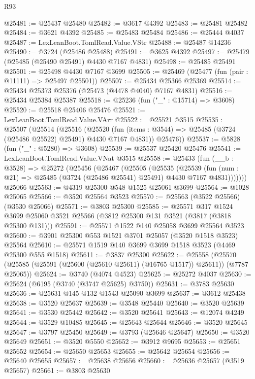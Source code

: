 \begin{lexlean}{R93}
\begin{coremodule}
@25481 := @25437 @25480
@25482 := @3617 @4392
@25483 := @25481 @25482
@25484 := @3621 @4392
@25485 := @25483 @25484
@25486 := @25444 @4037
@25487 := LexLeanBoot.TomlRead.Value.VStr
@25488 := @25487 @14236
@25490 := @3724 (@25486 @25488)
@25491 := @3625 @4392
@25497 := @25479 (@25485 (@25490 @25491) @4430 @7167 @4831)
@25498 := @25485 @25491
@25501 := @25498 @4430 @7167 @3699
@25505 := @25469 (@25477 (fun (pair : @11111) => @25497 @25501))
@25507 := @25434 @25366 @25369
@25514 := @25434 @25373 @25376 (@25473 (@4478 @4040) @7167 @4831)
@25516 := @25434 @25384 @25387
@25518 := @25236 (fun ("_" : @15714) => @3608)
@25520 := @25518 @25406 @25476
@25521 := LexLeanBoot.TomlRead.Value.VArr
@25522 := @25521 @3515
@25535 := @25507
    (@25514
      (@25516
        (@25520 (fun (items : @3544) => @25485 (@3724 (@25486 @25522) @25491) @4430 @7167 @4831))
        @25476))
@25537 := @5828 (fun ("_" : @5280) => @3608)
@25539 := @25537 @25420 @25476
@25541 := LexLeanBoot.TomlRead.Value.VNat @3515
@25558 := @25433
    (fun (__b : @3528) =>
    @25272
      (@25456
        (@25467
          (@25505
            (@25535
              (@25539
                (fun (num : @21) => @25485 (@3724 (@25486 @25541) @25491) @4430 @7167 @4831)))))))
    @25066
@25563 := @4319 @25300 @548 @1525 @25061 @3699
@25564 := @1028 @25065
@25566 := @3520 @25564 @3523
@25570 := @25563 (@3522 @25566) (@3530 @25066)
@25571 := @3803 @25300
@25585 := @25571
    @317
    @1524
    @3699
    @25060
    @3521
    @25566
    (@3812 @25300 @131 @3521 (@3817 (@3818 @25300 @131)))
@25591 := @25571 @1522 @140 @25058 @3699 @25564 @3523
@25600 := @3901 @25300 @553 @1521 @3701 @25057 (@3520 @1518 @3523) @25564
@25610 := @25571 @1519 @140 @3699 @3699 @1518 @3523 (@4469 @25300 @555 @1518)
@25611 := @3837 @25300
@25622 := @25558
    (@25570 (@25585 (@25591 (@25600 (@25610 @25611) (@16765 @1517)) @25611)) (@7787 @25065))
@25624 := @3740 (@4074 @4523)
@25625 := @25272 @4037
@25630 := @25624 (@6195 (@3740 (@3747 @25625) @3750))
@25631 := @3783 @25630
@25636 := @25631 @145 @132 @1543 @25090 @3699
@25637 := @3612 @25438
@25638 := @3520 @25637
@25639 := @3548 @25440
@25640 := @3520 @25639
@25641 := @3530 @25442
@25642 := @3520 @25641
@25643 := @12074 @4249
@25644 := @3529 @10485
@25645 := @25643 @25644
@25646 := @3520 @25645
@25647 := @3797 @25450
@25649 := @3793 (@25646 @25647)
@25650 := @3520 @25649
@25651 := @3520 @5550
@25652 := @3912 @9695
@25653 := @25651 @25652
@25654 := @25650 @25653
@25655 := @25642 @25654
@25656 := @25640 @25655
@25657 := @25638 @25656
@25660 := @25636 @25657 (@3519 @25657)
@25661 := @3803 @25630

\end{coremodule}
\end{lexlean}
